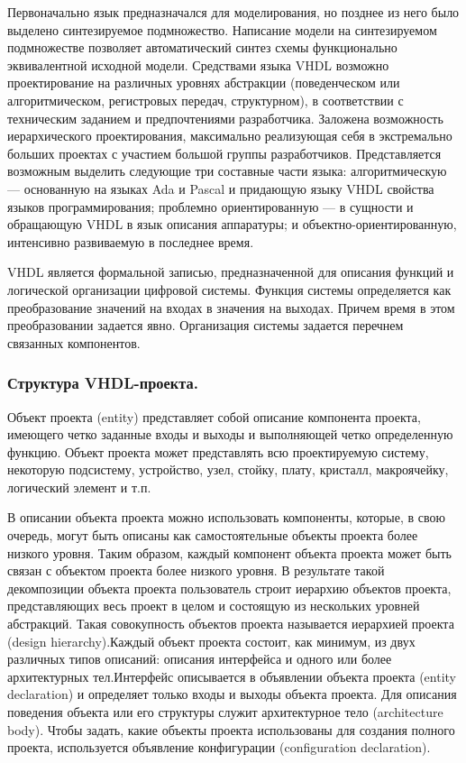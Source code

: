 Первоначально язык предназначался для моделирования, но позднее из него было выделено синтезируемое подмножество. Написание модели на синтезируемом подмножестве позволяет автоматический синтез схемы функционально эквивалентной исходной модели. Средствами языка VHDL возможно проектирование на различных уровнях абстракции (поведенческом или алгоритмическом, регистровых передач, структурном), в соответствии с техническим заданием и предпочтениями разработчика. Заложена возможность иерархического проектирования, максимально реализующая себя в экстремально больших проектах с участием большой группы разработчиков. Представляется возможным выделить следующие три составные части языка: алгоритмическую — основанную на языках Ada и Pascal и придающую языку VHDL свойства языков программирования; проблемно ориентированную — в сущности и обращающую VHDL в язык описания аппаратуры; и объектно-ориентированную, интенсивно развиваемую в последнее время.

VHDL является формальной записью, предназначенной для описания функций и логической организации цифровой системы. Функция системы определяется как преобразование значений на входах в значения на выходах. Причем время в этом преобразовании задается явно. Организация системы задается перечнем связанных компонентов.

\subsubsection{Структура VHDL-проекта. }

Объект проекта (entity) представляет собой описание компонента проекта, имеющего четко заданные входы и выходы и выполняющей четко определенную функцию. Объект проекта может представлять всю проектируемую систему, некоторую подсистему, устройство, узел, стойку, плату, кристалл, макроячейку, логический элемент и т.п.

В описании объекта проекта можно использовать компоненты, которые, в свою очередь, могут быть описаны как самостоятельные объекты проекта более низкого уровня. Таким образом, каждый компонент объекта проекта может быть связан с объектом проекта более низкого уровня. В результате такой декомпозиции объекта проекта пользователь строит иерархию объектов проекта, представляющих весь проект в целом и состоящую из нескольких уровней абстракций. Такая совокупность объектов проекта называется иерархией проекта (design hierarchy).Каждый объект проекта состоит, как минимум, из двух различных типов описаний: описания интерфейса и одного или более архитектурных тел.Интерфейс описывается в объявлении объекта проекта  (entity declaration)  и определяет только входы и выходы объекта проекта. Для описания поведения объекта или его структуры служит архитектурное тело (architecture body). Чтобы задать, какие объекты проекта использованы для создания полного проекта, используется объявление конфигурации (configuration declaration).

